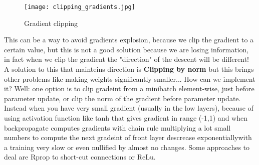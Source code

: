 \documentclass[12pt]{book}
\begin{document}
\begin{figure}[h]
	\centering
	\texttt{[image: clipping\_gradients.jpg]}
	\caption{Gradient clipping}
	\label{fig:gradient_clipping}
\end{figure}
This can be a way to avoid gradients explosion, because we clip the gradient to a certain value, but this is not a good solution because we are losing information, in fact when we clip the gradient the "direction" of the descent will be different! A solution to this that mainteins direction is \textbf{Clipping by norm} but this brings other problems like making weights significantly smaller...\newline
How can we implement it? Well: one option is to clip gradeint from a minibatch element-wise, just before parameter update, or clip the norm of the gradient before parameter update.
\newline\newline
Instead when you have very small gradient (usually in the low layers), because of using activation function like tanh that gives gradient in range (-1,1) and when backpropagate computes gradients with chain rule multiplying a lot small numbers to compute the next gradeint of front layer descrease exponentiallywith a training very slow or even nullified by almost no changes.\newline
Some approaches to deal are Rprop to short-cut connections or ReLu.
\end{document}
